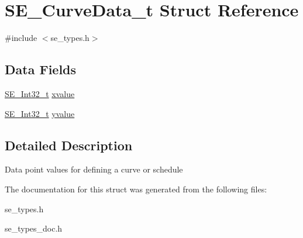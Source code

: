\hypertarget{structSE__CurveData__t}{}\section{S\+E\+\_\+\+Curve\+Data\+\_\+t Struct Reference}
\label{structSE__CurveData__t}


{\ttfamily \#include $<$se\+\_\+types.\+h$>$}

\subsection*{Data Fields}
\begin{DoxyCompactItemize}
\item 
\hyperlink{group__Int32_gaa7afc819cfc8033c5fa408e34da8b71a}{S\+E\+\_\+\+Int32\+\_\+t} \hyperlink{group__CurveData_gab9d114561fe7649670e94b5eb101119a}{xvalue}
\item 
\hyperlink{group__Int32_gaa7afc819cfc8033c5fa408e34da8b71a}{S\+E\+\_\+\+Int32\+\_\+t} \hyperlink{group__CurveData_gaa753c6f9b2f10fb00d90d2aa26ed0489}{yvalue}
\end{DoxyCompactItemize}


\subsection{Detailed Description}
Data point values for defining a curve or schedule 

The documentation for this struct was generated from the following files\+:\begin{DoxyCompactItemize}
\item 
se\+\_\+types.\+h\item 
se\+\_\+types\+\_\+doc.\+h\end{DoxyCompactItemize}
